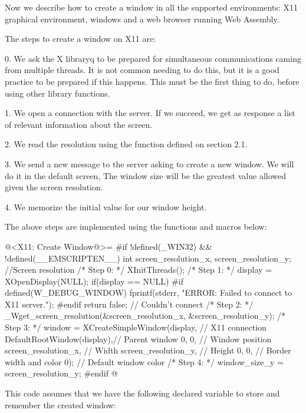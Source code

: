 
Now we describe how to create a window in all the supported
environments: X11 graphical environment, windows and a web browser
running Web Assembly.


The steps to create a window on X11 are:

0. We ask the X libraryq to be prepared for simultaneous
communications caming from multiple threads. It is not common needing
to do this, but it is a good practice to be prepared if this
happens. This must be the first thing to do, before using other
library functions.

1. We open a connection with the server. If we succeed, we get as
response a list of relevant information about the screen.

2. We read the resolution using the function defined on section 2.1.

3. We send a new message to the server asking to create a new
window. We will do it in the default screen, The window size will be
the greatest value allowed given the screen resolution.

4. We memorize the initial value for our window height.

The above steps are implemented using the functions and macros below:

\iniciocodigo
@<X11: Create Window@>=
#if !defined(_WIN32) && !defined(__EMSCRIPTEN__)
int screen_resolution_x, screen_resolution_y; //Screen resolution
/* Step 0: */
XInitThreads();
/* Step 1: */
display = XOpenDisplay(NULL);
if(display == NULL){
#if defined(W_DEBUG_WINDOW)
  fprintf(stderr, "ERROR: Failed to connect to X11 server.\n");
#endif
  return false; // Couldn't connect
}
/* Step 2: */
_Wget_screen_resolution(&screen_resolution_x, &screen_resolution_y);
/* Step 3: */
window = XCreateSimpleWindow(display, // X11 connection
                             DefaultRootWindow(display),// Parent window
                             0, 0, // Window position
                             screen_resolution_x, // Width
                             screen_resolution_y, // Height
                             0, 0, // Border width and color
                             0); // Default window color
/* Step 4: */
window_size_y = screen_resolution_y;
#endif
@
\fimcodigo

This code assumes that we have the following declared variable to
store and remember the created window:

